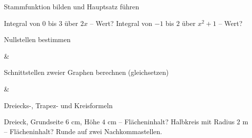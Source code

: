 \setcounter{aufgabe}{0}

\begin{aufgabe}{Stammfunktion bilden und Hauptsatz führen}
\begin{teile}
\teil Integral von $0$ bis $3$ über $2x$ – Wert?
\teil Integral von $-1$ bis $2$ über $x^2 + 1$ – Wert?
\end{teile}
\end{aufgabe}

\begin{aufgabe}{Nullstellen bestimmen}
\begin{gleichungsraster}[2]
 &
 \\
\end{gleichungsraster}
\end{aufgabe}

\begin{aufgabe}{Schnittstellen zweier Graphen berechnen (gleichsetzen)}
\begin{gleichungsraster}[2]
 &
 \\
\end{gleichungsraster}
\end{aufgabe}

\begin{aufgabe}{Dreiecks-, Trapez- und Kreisformeln}
\begin{teile}
\teil Dreieck, Grundseite $6$ cm, Höhe $4$ cm – Flächeninhalt?
\teil Halbkreis mit Radius $2$ m – Flächeninhalt? Runde auf zwei Nachkommastellen.
\end{teile}
\end{aufgabe}

